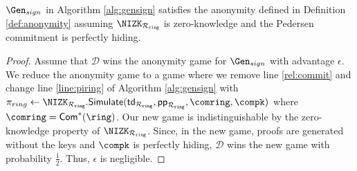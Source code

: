 %	
%	


\begin{lemma} \label{lem:anonymity} $ \Gen_{sign}$ in Algorithm \ref{alg:gensign} satisfies the anonymity defined in Definition \ref{def:anonymity} assuming  $ \NIZK_{\rsnark} $ is zero-knowledge and the Pedersen commitment is perfectly hiding.
\end{lemma}

\begin{proof} Assume that $ \mathcal{D} $ wins the anonymity game for $ \Gen_{sign} $ with advantage $ \epsilon $.
We reduce the anonymity game to a game where we remove line \ref{rel:commit} and change line \ref{line:piring} of Algorithm \ref{alg:gensign} with $ \pi_{ring} \leftarrow \NIZK_{\rsnark}.\mathsf{Simulate}(\tw_{\Rring}, \pp_{\Rring},\comring, \compk) $ where $ \comring = \com^*(\ring) $.  Our new game is indistinguishable by the zero-knowledge property of $ \NIZK_{\rsnark} $.  Since, in the new game, proofs are generated without the keys and $ \compk $ is perfectly hiding,   $ \mathcal{D} $ wins the new game with probability $ \frac{1}{2} $. Thus, $ \epsilon $ is negligible.		
\end{proof}



